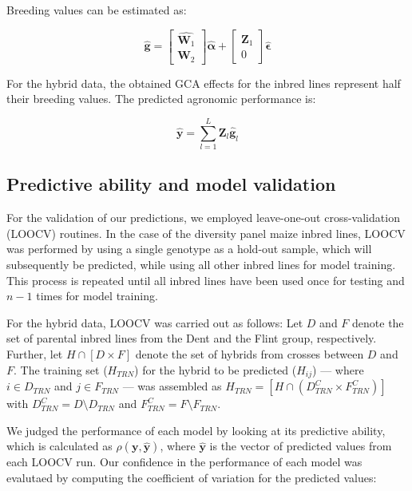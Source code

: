 \documentclass[12pt,titlepage]{article}
\begin{document}
Breeding values can be estimated as:

\begin{equation} \label{eq:breeding-values}
\hat{\mathbf{g}} = 
 \begin{bmatrix}
  \hat{\mathbf{W}_1} \\
  \mathbf{W}_2 
 \end{bmatrix}
 \hat{\boldsymbol{\alpha}}
 + 
 \begin{bmatrix}
  \mathbf{Z}_1 \\
  0
 \end{bmatrix}
 \hat{\boldsymbol{\epsilon}} 
\end{equation}

For the hybrid data, the obtained GCA effects for the inbred lines represent 
half their breeding values.
The predicted agronomic performance is:

\begin{equation} \label{eq:predicted-performance}
\hat{\mathbf{y}} = \sum_{l=1}^{L} \mathbf{Z}_{l}\hat{\mathbf{g}}_{l} 
\end{equation}




\subsection{Predictive ability and model validation}
For the validation of our predictions, we employed leave-one-out
cross-validation (LOOCV) routines.
In the case of the diversity panel maize inbred lines, LOOCV was performed by 
using a single genotype as a hold-out sample, which will subsequently be 
predicted, while using all other inbred lines for model training.
This process is repeated until all inbred lines have been used once for testing
and $n - 1$ times for model training.

For the hybrid data, LOOCV was carried out as follows:
Let $D$ and $F$ denote the set of parental inbred lines from the Dent and the 
Flint group, respectively.
Further, let $H \cap [D \times F]$ denote the set of hybrids from crosses 
between $D$ and $F$.
The training set ($H_{TRN}$) for the hybrid to be predicted ($H_{ij}$) --- 
where $i \in D_{TRN}$ and $j \in F_{TRN}$ --- was assembled as 
$H_{TRN} = [H \cap (D_{TRN}^{C} \times F_{TRN}^{C})]$ with
$D_{TRN}^{C} = D \setminus D_{TRN}$ and $F_{TRN}^{C} = F \setminus F_{TRN}$.

We judged the performance of each model by looking at its predictive ability,
which is calculated as $\rho(\mathbf{y}, \mathbf{\hat{y}})$, where 
$\mathbf{\hat{y}}$ is the vector of predicted values from each LOOCV run.
Our confidence in the performance of each model was evalutaed by computing the
coefficient of variation for the predicted values:
\end{document}
